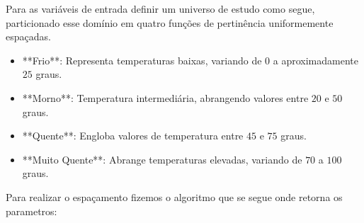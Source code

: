 \documentclass[a4paper,12pt]{article}
\begin{document}
Para as variáveis de entrada definir um universo de estudo como segue, particionado esse domínio em quatro funções de pertinência uniformemente espaçadas. 

\begin{itemize}
    \item **Frio**: Representa temperaturas baixas, variando de $0$ a aproximadamente $25$ graus.
    \item **Morno**: Temperatura intermediária, abrangendo valores entre $20$ e $50$ graus.
    \item **Quente**: Engloba valores de temperatura entre $45$ e $75$ graus.
    \item **Muito Quente**: Abrange temperaturas elevadas, variando de $70$ a $100$ graus.
\end{itemize}

Para realizar o espaçamento fizemos o algoritmo que se segue onde retorna os parametros: 
\end{document}
